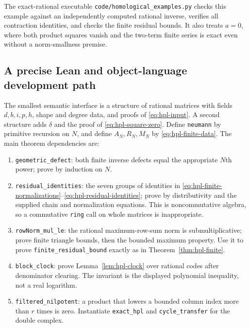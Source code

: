 The exact-rational executable \texttt{code/homological\_examples.py}
checks this example against an independently computed rational inverse,
verifies all contraction identities, and checks the finite residual bounds.
It also treats $a=0$, where both product squares vanish and the two-term
finite series is exact even without a norm-smallness premise.

\subsection{A precise Lean and object-language development path}

The smallest semantic interface is a structure of rational matrices with
fields $d,b,i,p,h$, shape and degree data, and proofs of
\eqref{eq:hpl-input}.  A second structure adds $\delta$ and the proof of
\eqref{eq:hpl-square-zero}.  Define \texttt{neumann} by primitive recursion
on $N$, and define $A_N,R_N,M_N$ by \eqref{eq:hpl-finite-data}.
The main theorem dependencies are:
\begin{enumerate}
\item \texttt{geometric\_defect}: both finite inverse defects equal the
appropriate $N$th power; prove by induction on $N$.
\item \texttt{residual\_identities}: the seven groups of identities in
\eqref{eq:hpl-finite-normalizations}--\eqref{eq:hpl-residual-identities}; prove by distributivity and the supplied
chain and normalization equations.  This is noncommutative algebra, so a
commutative \texttt{ring} call on whole matrices is inappropriate.
\item \texttt{rowNorm\_mul\_le}: the rational maximum-row-sum norm is
submultiplicative; prove finite triangle bounds, then the bounded maximum
property.  Use it to prove \texttt{finite\_residual\_bound} exactly as in
Theorem~\ref{thm:hpl-finite}.
\item \texttt{block\_clock}: prove Lemma~\ref{lem:hpl-clock} over rational
codes after denominator clearing.  The invariant is the displayed
polynomial inequality, not a real logarithm.
\item \texttt{filtered\_nilpotent}: a product that lowers a bounded column
index more than $r$ times is zero.  Instantiate \texttt{exact\_hpl} and
\texttt{cycle\_transfer} for the double complex.
\end{enumerate}

